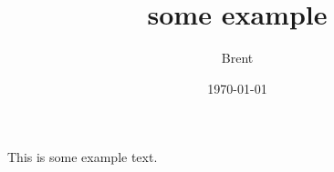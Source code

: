 \documentclass{article}
\title{some example}
\author{Brent}
\date{\today}
\begin{document}
\maketitle

This is some example text.
\end{document}
